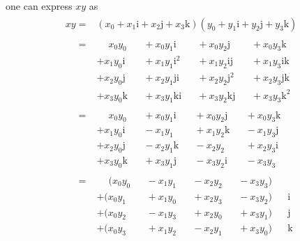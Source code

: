 \documentclass[a4paper,10pt]{scrartcl}
\begin{document}
\noindent one can express $xy$ as
{\setlength{\mathindent}{\mathindent / 2}
\begin{gather*}
 \begin{alignat*}{1}
  x y ={}& (x_0 + x_1 \mathrm{i} + x_2 \mathrm{j} + x_3 \mathrm{k}) (y_0 + y_1 \mathrm{i} + y_2 \mathrm{j} + y_3 \mathrm{k})
 \end{alignat*} \\
 \begin{alignat*}{4}
  \phantom{xy}={}&\phantom{{}+{}} x_0 y_0 && {}+ x_0 y_1 \mathrm{i} && {}+ x_0 y_2 \mathrm{j} && {}+ x_0 y_3 \mathrm{k} \\
  &+ x_1 y_0 \mathrm{i} && {}+ x_1 y_1 \mathrm{i}^2 && {}+ x_1 y_2 \mathrm{ij}  && {}+ x_1 y_3 \mathrm{ik} \\
  &+ x_2 y_0 \mathrm{j} && {}+ x_2 y_1 \mathrm{ji}  && {}+ x_2 y_2 \mathrm{j}^2 && {}+ x_2 y_3 \mathrm{jk} \\
  &+ x_3 y_0 \mathrm{k} && {}+ x_3 y_1 \mathrm{ki}  && {}+ x_3 y_2 \mathrm{kj}  && {}+ x_3 y_3 \mathrm{k}^2
 \end{alignat*} \\
 \begin{alignat*}{4}
  \phantom{xy}={}&\phantom{{}+{}} x_0 y_0 && {}+ x_0 y_1 \mathrm{i} && {}+ x_0 y_2 \mathrm{j} && {}+ x_0 y_3 \mathrm{k} \\
  &+ x_1 y_0 \mathrm{i} && {}- x_1 y_1 && {}+ x_1 y_2 \mathrm{k}  && {}- x_1 y_3 \mathrm{j} \\
  &+ x_2 y_0 \mathrm{j} && {}- x_2 y_1 \mathrm{k}  && {}- x_2 y_2 && {}+ x_2 y_3 \mathrm{i} \\
  &+ x_3 y_0 \mathrm{k} && {}+ x_3 y_1 \mathrm{j}  && {}- x_3 y_2 \mathrm{i}  && {}- x_3 y_3
 \end{alignat*} \\
 \begin{alignat*}{5}
  \phantom{xy}={}&\phantom{{}+{}} (x_0 y_0 && {}- x_1 y_1 && {}- x_2 y_2 && {}- x_3 y_3) \\
  &+ (x_0 y_1 && {}+ x_1 y_0 && {}+ x_2 y_3 && {}- x_3 y_2) && \mathrm{i} \\
  &+ (x_0 y_2 && {}- x_1 y_3 && {}+ x_2 y_0 && {}+ x_3 y_1) && \mathrm{j} \\
  &+ (x_0 y_3 && {}+ x_1 y_2 && {}- x_2 y_1 && {}+ x_3 y_0) && \mathrm{k}
 \end{alignat*}
\end{gather*}}
\end{document}

